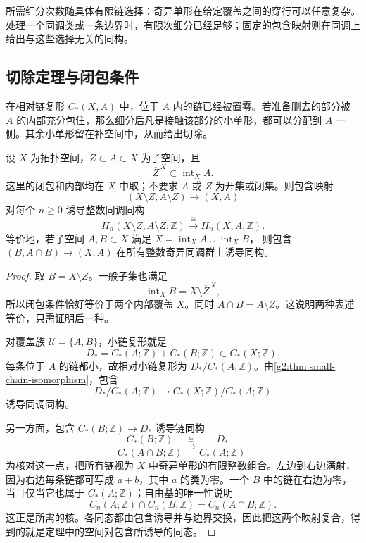 所需细分次数随具体有限链选择：奇异单形在给定覆盖之间的穿行可以任意复杂。处理一个同调类或一条边界时，有限次细分已经足够；固定的包含映射则在同调上给出与这些选择无关的同构。

\subsection{切除定理与闭包条件}
\label{g2:subsec:0203:04}

在相对链复形 \(C_*(X,A)\) 中，位于 \(A\) 内的链已经被置零。若准备删去的部分被 \(A\) 的内部充分包住，那么细分后凡是接触该部分的小单形，都可以分配到 \(A\) 一侧。其余小单形留在补空间中，从而给出切除。

\begin{theorem}[奇异同调的切除定理]\label{g2:thm:singular-excision}
	设 \(X\) 为拓扑空间，\(Z\subset A\subset X\) 为子空间，且
	\[
		\overline Z^{\,X}\subset\operatorname{int}_X A.
	\]
	这里的闭包和内部均在 \(X\) 中取；不要求 \(A\) 或 \(Z\) 为开集或闭集。则包含映射
	\[
		(X\setminus Z,A\setminus Z)\longrightarrow(X,A)
	\]
	对每个 \(n\ge0\) 诱导整数同调同构
	\[
		H_n(X\setminus Z,A\setminus Z;\mathbb Z)
		\xrightarrow{\ \cong\ }H_n(X,A;\mathbb Z).
	\]
	等价地，若子空间 \(A,B\subset X\) 满足
	\(X=\operatorname{int}_X A\cup\operatorname{int}_X B\)，
	则包含 \((B,A\cap B)\to(X,A)\) 在所有整数奇异同调群上诱导同构。
\end{theorem}
\begin{proof}
	取 \(B=X\setminus Z\)。一般子集也满足
	\[
		\operatorname{int}_X B=X\setminus\overline Z^{\,X},
	\]
	所以闭包条件恰好等价于两个内部覆盖 \(X\)。同时 \(A\cap B=A\setminus Z\)。这说明两种表述等价，只需证明后一种。

	对覆盖族 \(\mathcal U=\{A,B\}\)，小链复形就是
	\[
		D_*=C_*(A;\mathbb Z)+C_*(B;\mathbb Z)\subset C_*(X;\mathbb Z).
	\]
	每条位于 \(A\) 的链都小，故相对小链复形为 \(D_*/C_*(A;\mathbb Z)\)。由\cref{g2:thm:small-chain-isomorphism}，包含
	\[
		D_*/C_*(A;\mathbb Z)\longrightarrow
		C_*(X;\mathbb Z)/C_*(A;\mathbb Z)
	\]
	诱导同调同构。

	另一方面，包含 \(C_*(B;\mathbb Z)\to D_*\) 诱导链同构
	\[
		\frac{C_*(B;\mathbb Z)}{C_*(A\cap B;\mathbb Z)}
		\xrightarrow{\ \cong\ }
		\frac{D_*}{C_*(A;\mathbb Z)}.
	\]
	为核对这一点，把所有链视为 \(X\) 中奇异单形的有限整数组合。左边到右边满射，因为右边每条链都可写成 \(a+b\)，其中 \(a\) 的类为零。一个 \(B\) 中的链在右边为零，当且仅当它也属于 \(C_*(A;\mathbb Z)\)；自由基的唯一性说明
	\[
		C_n(A;\mathbb Z)\cap C_n(B;\mathbb Z)
		=C_n(A\cap B;\mathbb Z).
	\]
	这正是所需的核。各同态都由包含诱导并与边界交换，因此把这两个映射复合，得到的就是定理中的空间对包含所诱导的同态。
\end{proof}

